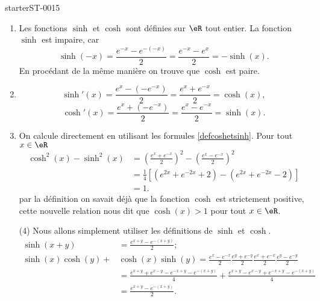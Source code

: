 
\begin{corrige}{starterST-0015}


\begin{enumerate}
\item Les fonctions  $\sinh$ et  $\cosh$ sont définies sur $\eR$ tout entier. La fonction $\sinh$ est impaire, car 
  \begin{equation*}
    \sinh(-x) = \frac{e^{-x}-e^{-(-x)}}{2} = \frac{e^{-x}-e^{x}}{2} = -\sinh(x).
  \end{equation*}
En procédant de la m\^eme manière on trouve que $\cosh$ est paire.  
\item 
\[
\sinh'(x) = \frac{e^{x}-\left(-e^{-x}\right)}{2} = \frac{e^{x}+e^{-x}}{2}  = \cosh(x),
\]
\[
\cosh'(x) = \frac{e^{x}+\left(-e^{-x}\right)}{2} = \frac{e^{x}-e^{-x}}{2}  = \sinh(x).
\]
\item On calcule directement en utilisant les formules \eqref{defcoshetsinh}. Pour tout $x\in\eR$ 
    \begin{subequations}
        \begin{align}
            \cosh^2 (x) - \sinh^2 (x) &= \left(\frac{e^{x}+e^{-x}}{2}\right)^2 -\left(\frac{e^{x}-e^{-x}}{2}\right)^2\\
            &= \frac{1}{4} \left[(e^{2x}+e^{-2x}+2) - (e^{2x}+e^{-2x}-2)\right]\\
            &= 1.
        \end{align}
    \end{subequations}
par la définition on savait déjà que la fonction $\cosh$ est strictement positive, cette nouvelle relation nous dit que $\cosh(x)>1$ pour tout $x\in\eR$.
\item[(4)] Nous allons simplement utiliser les définitions de $\sinh$ et  $\cosh$. 
  \begin{equation*}
    \begin{aligned}
      \sinh (x+y)& = \frac{e^{x+y}-e^{-(x+y)}}{2} ; \\
      \sinh(x) \cosh(y)+&\cosh(x)\sinh(y) =\frac{e^{x}-e^{-x}}{2}\frac{e^{y}+e^{-y}}{2}\frac{e^{x}+e^{-x}}{2}\frac{e^{y}-e^{-y}}{2}\\
      &=\frac{e^{x+y}+e^{x-y}-e^{-x+y}-e^{-(x+y)}}{4} +\frac{e^{x+y}-e^{x-y}+e^{-x+y}-e^{-(x+y)}}{4} \\
      &=\frac{e^{x+y}-e^{-(x+y)}}{2}. 
    \end{aligned}

\end{equation*}
\end{enumerate}
\end{corrige}
